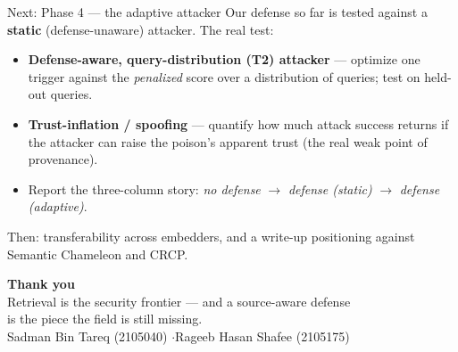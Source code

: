 \documentclass[aspectratio=169,11pt]{beamer}
\begin{document}
\begin{frame}{Next: Phase 4 --- the adaptive attacker}
  \small
  Our defense so far is tested against a \textbf{static} (defense-unaware) attacker. The real test:
  \begin{itemize}
    \item \textbf{Defense-aware, query-distribution (T2) attacker} --- optimize one trigger against the \emph{penalized} score over a distribution of queries; test on held-out queries.
    \item \textbf{Trust-inflation / spoofing} --- quantify how much attack success returns if the attacker can raise the poison's apparent trust (the real weak point of provenance).
    \item Report the three-column story: \emph{no defense} $\to$ \emph{defense (static)} $\to$ \emph{defense (adaptive)}.
  \end{itemize}
  \vspace{0.4em}
  Then: transferability across embedders, and a write-up positioning against Semantic Chameleon and CRCP.
\end{frame}

\begin{frame}[plain]
  \centering
  \vspace{1.5em}
  {\Large\color{rbblue}\textbf{Thank you}}\\[0.8em]
  \small Retrieval is the security frontier --- and a source-aware defense\\ is the piece the field is still missing.\\[1.2em]
  \footnotesize Sadman Bin Tareq (2105040) \quad$\cdot$\quad Rageeb Hasan Shafee (2105175)
\end{frame}
\end{document}
